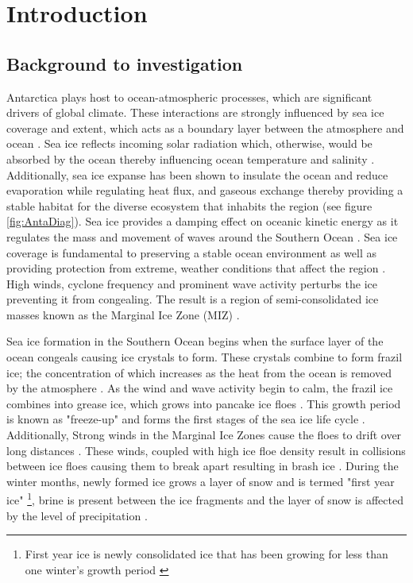 \chapter{Introduction}
\label{ch:ch1}
\section{Background to investigation}
\label{sec:ch1.section1}

Antarctica plays host to ocean-atmospheric processes, which are significant drivers of global climate. These interactions are strongly influenced by sea ice coverage and extent, which acts as a boundary layer between the atmosphere and ocean \cite{parkinson2004southern}. Sea ice reflects incoming solar radiation which, otherwise, would be absorbed by the ocean thereby influencing ocean temperature and salinity \cite{parkinson2004southern}. Additionally, sea ice expanse  has been shown to insulate the ocean and reduce evaporation while regulating heat flux, and gaseous exchange \cite{deconto2003rapid} thereby providing a stable habitat for the diverse ecosystem that inhabits the region \cite{arrigo2004large} (see figure \ref{fig:AntaDiag}). Sea ice provides a damping effect on oceanic kinetic energy as it regulates the mass and movement of waves around the Southern Ocean \cite{parkinson2004southern,roach2020antarctic}. Sea ice coverage is fundamental to preserving a stable ocean environment as well as providing protection from extreme, weather conditions that affect the region \cite{vichi2019effects}. High winds, cyclone frequency and prominent wave activity perturbs the ice preventing it from congealing. The result is a region of semi-consolidated ice masses known as the Marginal Ice Zone (MIZ) \cite{vichi2019effects}.

Sea ice formation in the Southern Ocean begins when the surface layer of the ocean congeals causing ice crystals to form. These crystals combine to form frazil ice; the concentration of which increases as the heat from the ocean is removed by the atmosphere \cite{arrigo2004large}. As the wind and wave activity begin to calm, the frazil ice combines into grease ice, which grows into pancake ice floes \cite{arrigo2004large}. This growth period is known as "freeze-up" and forms the first stages of the sea ice life cycle \cite{barber2005microwave}. Additionally, Strong winds in the Marginal Ice Zones cause the floes to drift over long distances \cite{alberello2019drift}. These winds, coupled with high ice floe density result in collisions between ice floes causing them to break apart \cite{STEER2008933} resulting in brash ice \cite{icedefinition1992}.  During the winter months, newly formed ice grows a layer of snow \cite{barber2005microwave} and is termed "first year ice" \footnote{First year ice is newly consolidated ice that has been growing for less than one winter's growth period \cite{icedefinition1992}}, brine is present between the ice fragments and the layer of snow is affected by the level of precipitation \cite{barber2005microwave}.\par

